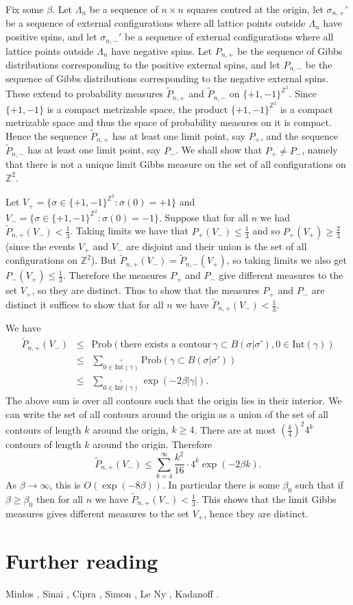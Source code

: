 \documentclass{article}
\newcommand{\Prob}{\text{Prob}}
\newcommand{\Int}{\text{Int}}
\begin{document}
Fix some $\beta$.
Let $\Lambda_n$ be a sequence of $n \times n$ squares centred at the origin, let $\sigma_{n,+}'$ be a sequence of external configurations where all lattice points outside $\Lambda_n$
have positive spins, and let $\sigma_{n,-}'$ be a sequence of external configurations where all lattice points outside $\Lambda_n$ have negative spins.
Let $P_{n,+}$ be the sequence of Gibbs distributions corresponding to the positive external spins, and let $P_{n,-}$ be the sequence of Gibbs distributions corresponding to the negative external spins. These extend to probability measures $\widetilde{P}_{n,+}$ and $\widetilde{P}_{n,-}$ on $\{+1,-1\}^{\mathbb{Z}^2}$. Since $\{+1,-1\}$ is a compact metrizable space, the product $\{+1,-1\}^{\mathbb{Z}^2}$ is a compact metrizable space and thus the space of probability measures on it is compact. Hence the sequence $\widetilde{P}_{n,+}$
has at least one limit point, say $P_{+}$, and the sequence $\widetilde{P}_{n,-}$ has at least one limit point, say $P_{-}$. We shall show that $P_+ \neq P_-$, namely that there is not a unique limit Gibbs measure on the set of all configurations on $\mathbb{Z}^2$.


Let $V_+=\{\sigma \in \{+1,-1\}^{\mathbb{Z}^2}: \sigma(0)=+1\}$ and $V_-= \{\sigma \in \{+1,-1\}^{\mathbb{Z}^2}:\sigma(0)=-1\}$. Suppose that for all $n$ we had
$\widetilde{P}_{n,+}(V_-) < \frac{1}{3}$. Taking limits we have that $P_+(V_-) \leq \frac{1}{3}$ and so $P_+(V_+) \geq \frac{2}{3}$ (since the events $V_+$ and $V_-$ are disjoint and their union is the set of all configurations on $\mathbb{Z}^2$). But $\widetilde{P}_{n,+}(V_-)=\widetilde{P}_{n,-}(V_+)$, so taking limits we also get $P_-(V_+) \leq \frac{1}{3}$. Therefore the measures $P_+$ and $P_-$ give different measures to the set $V_+$, so they are distinct. Thus to show that the measures $P_+$ and $P_-$ are distinct it suffices to show that for all $n$ we have $\widetilde{P}_{n,+}(V_-) < \frac{1}{3}$.

We have
\begin{eqnarray*}
\widetilde{P}_{n,+}(V_-)&\leq&\Prob\left(\textrm{there exists a contour} \, \gamma \subset B(\sigma|\sigma'), 0 \in \Int(\gamma)\right)\\
&\leq&\sum_{\stackrel{\gamma}{0 \in \Int(\gamma)}} \Prob(\gamma \subset B(\sigma|\sigma'))\\
&\leq&\sum_{\stackrel{\gamma}{0 \in \Int(\gamma)}} \exp(-2\beta|\gamma|).
\end{eqnarray*}
The above sum is over all contours such that the origin lies in their interior. We can write the set of all contours around the origin as a union of the set of all contours of length $k$ around the origin, $k \geq 4$. There are at most $\left( \frac{k}{4} \right)^2 4^k$ contours of length $k$ around the origin. Therefore
\[
\widetilde{P}_{n,+}(V_-)\leq\sum_{k=4}^\infty \frac{k^2}{16} \cdot 4^k \exp(-2\beta k).
\]
As $\beta \to \infty$, this is $O(\exp(-8\beta))$. In particular there is some $\beta_0$ such that if $\beta \geq \beta_0$ then for all $n$ we have $\widetilde{P}_{n,+}(V_-)< \frac{1}{3}$. This shows
that the limit Gibbs measures gives different measures to the set $V_+$, hence they are distinct. 

\section*{Further reading}
Minlos \cite{minlos}, Sinai \cite{MR691854}, Cipra \cite{MR936054}, Simon \cite{simon},  Le Ny \cite{ny}, Kadanoff \cite{kadanoff}.



\end{document}

